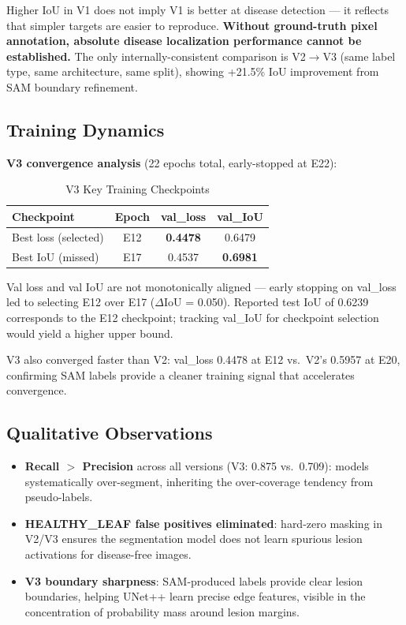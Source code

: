 \documentclass[10pt,a4paper]{article}
\begin{document}
Higher IoU in V1 does not imply V1 is better at disease detection --- it reflects that simpler targets are easier to reproduce. \textbf{Without ground-truth pixel annotation, absolute disease localization performance cannot be established.} The only internally-consistent comparison is V2$\to$V3 (same label type, same architecture, same split), showing +21.5\% IoU improvement from SAM boundary refinement.

\subsection{Training Dynamics}

\textbf{V3 convergence analysis} (22 epochs total, early-stopped at E22):

\begin{table}[H]
\centering
\caption{V3 Key Training Checkpoints}
\label{tab:v3_dynamics}
\begin{tabular}{lccc}
\toprule
\textbf{Checkpoint} & \textbf{Epoch} & \textbf{val\_loss} & \textbf{val\_IoU} \\
\midrule
Best loss (selected) & E12 & \textbf{0.4478} & 0.6479 \\
Best IoU (missed)    & E17 & 0.4537           & \textbf{0.6981} \\
\bottomrule
\end{tabular}
\end{table}

Val loss and val IoU are not monotonically aligned --- early stopping on val\_loss led to selecting E12 over E17 ($\Delta$IoU = 0.050). Reported test IoU of 0.6239 corresponds to the E12 checkpoint; tracking val\_IoU for checkpoint selection would yield a higher upper bound.

V3 also converged faster than V2: val\_loss 0.4478 at E12 vs.\ V2's 0.5957 at E20, confirming SAM labels provide a cleaner training signal that accelerates convergence.

\subsection{Qualitative Observations}

\begin{itemize}
\item \textbf{Recall $>$ Precision} across all versions (V3: 0.875 vs.\ 0.709): models systematically over-segment, inheriting the over-coverage tendency from pseudo-labels.
\item \textbf{HEALTHY\_LEAF false positives eliminated}: hard-zero masking in V2/V3 ensures the segmentation model does not learn spurious lesion activations for disease-free images.
\item \textbf{V3 boundary sharpness}: SAM-produced labels provide clear lesion boundaries, helping UNet++ learn precise edge features, visible in the concentration of probability mass around lesion margins.
\end{itemize}
\end{document}

